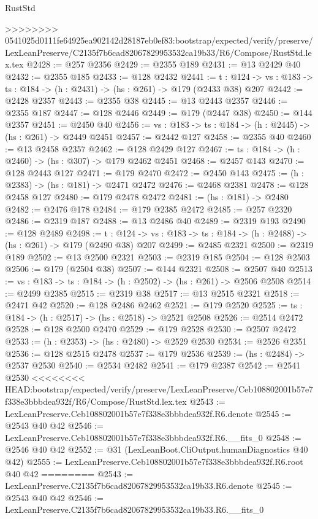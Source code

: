 \begin{lexlean}{RustStd}
\begin{coremodule}
{\begin{coremodule}
{{{{{>>>>>>>> 0541025d0111fe64925ea902142d28187eb0ef83:bootstrap/expected/verify/preserve/LexLeanPreserve/C2135f7b6cad82067829953532ca19b33/R6/Compose/RustStd.lex.tex
@2428 := @257 @2356
@2429 := @2355 @189
@2431 := @13 @2429 @40
@2432 := @2355 @185
@2433 := @128 @2432
@2441 := {t : @124} ->
  {vs : @183} -> {ts : @184} -> (h : @2431) -> (hs : @261) -> @179 (@2433 @38) @207
@2442 := @2428 @2357
@2443 := @2355 @38
@2445 := @13 @2443 @2357
@2446 := @2355 @187
@2447 := @128 @2446
@2449 := @179 (@2447 @38)
@2450 := @144 @2357
@2451 := @2450 @40
@2456 := {vs : @183} -> {ts : @184} -> (h : @2445) -> (hs : @261) -> @2449 @2451
@2457 := @2442 @127
@2458 := @2355 @40
@2460 := @13 @2458 @2357
@2462 := @128 @2429 @127
@2467 := {ts : @184} -> (h : @2460) -> (hs : @307) -> @179 @2462 @2451
@2468 := @2457 @143
@2470 := @128 @2443 @127
@2471 := @179 @2470
@2472 := @2450 @143
@2475 := (h : @2383) -> (hs : @181) -> @2471 @2472
@2476 := @2468 @2381
@2478 := @128 @2458 @127
@2480 := @179 @2478 @2472
@2481 := (hs : @181) -> @2480
@2482 := @2476 @178
@2484 := @179 @2385 @2472
@2485 := @257 @2320
@2486 := @2319 @187
@2488 := @13 @2486 @40
@2489 := @2319 @193
@2490 := @128 @2489
@2498 := {t : @124} ->
  {vs : @183} -> {ts : @184} -> (h : @2488) -> (hs : @261) -> @179 (@2490 @38) @207
@2499 := @2485 @2321
@2500 := @2319 @189
@2502 := @13 @2500 @2321
@2503 := @2319 @185
@2504 := @128 @2503
@2506 := @179 (@2504 @38)
@2507 := @144 @2321
@2508 := @2507 @40
@2513 := {vs : @183} -> {ts : @184} -> (h : @2502) -> (hs : @261) -> @2506 @2508
@2514 := @2499 @2385
@2515 := @2319 @38
@2517 := @13 @2515 @2321
@2518 := @2471 @42
@2520 := @128 @2486 @2462
@2521 := @179 @2520
@2525 := {ts : @184} -> (h : @2517) -> (hs : @2518) -> @2521 @2508
@2526 := @2514 @2472
@2528 := @128 @2500 @2470
@2529 := @179 @2528
@2530 := @2507 @2472
@2533 := (h : @2353) -> (hs : @2480) -> @2529 @2530
@2534 := @2526 @2351
@2536 := @128 @2515 @2478
@2537 := @179 @2536
@2539 := (hs : @2484) -> @2537 @2530
@2540 := @2534 @2482
@2541 := @179 @2387
@2542 := @2541 @2530
<<<<<<<< HEAD:bootstrap/expected/verify/preserve/LexLeanPreserve/Ceb108802001b57e7f338e3bbbdea932f/R6/Compose/RustStd.lex.tex
@2543 := LexLeanPreserve.Ceb108802001b57e7f338e3bbbdea932f.R6.denote
@2545 := @2543 @40 @42
@2546 := LexLeanPreserve.Ceb108802001b57e7f338e3bbbdea932f.R6.__fits_0
@2548 := @2546 @40 @42
@2552 := @31 (LexLeanBoot.CliOutput.humanDiagnostics @40 @42)
@2555 := LexLeanPreserve.Ceb108802001b57e7f338e3bbbdea932f.R6.root @40 @42
========
@2543 := LexLeanPreserve.C2135f7b6cad82067829953532ca19b33.R6.denote
@2545 := @2543 @40 @42
@2546 := LexLeanPreserve.C2135f7b6cad82067829953532ca19b33.R6.__fits_0
}}}}}
\end{coremodule}}
\end{coremodule}
\end{lexlean}
